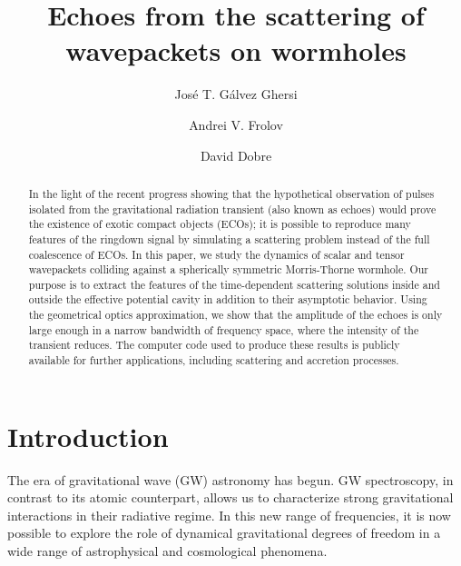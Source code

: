 \documentclass[article,aps,nofootinbib,twocolumn,superscriptaddress]{revtex4-1}
\begin{document}
\title{Echoes from the scattering of wavepackets on wormholes}

\author{Jos\'e T. G\'alvez Ghersi}
\author{Andrei V. Frolov}
\author{David Dobre}


\begin{abstract}
In the light of the recent progress showing that the hypothetical observation of pulses isolated from the gravitational radiation transient (also known as echoes) would prove the existence of exotic compact objects (ECOs); it is possible to reproduce many features of the ringdown signal by simulating a scattering problem instead of the full coalescence of ECOs. In this paper, we study the dynamics of scalar and tensor wavepackets colliding against a spherically symmetric Morris-Thorne wormhole. Our purpose is to extract the features of the time-dependent scattering solutions inside and outside the effective potential cavity in addition to their asymptotic behavior. Using the geometrical optics approximation, we show that the amplitude of the echoes is only large enough in a narrow bandwidth of frequency space, where the intensity of the transient reduces. The computer code used to produce these results is publicly available for further applications, including scattering and accretion processes.      
\end{abstract}

\maketitle


\section{Introduction}
The era of gravitational wave (GW) astronomy \citep{Abbott:2016blz, Abbott:2016nmj} has begun. GW spectroscopy, in contrast to its atomic counterpart, allows us to characterize strong gravitational interactions in their radiative regime. In this new range of frequencies, it is now possible to explore the role of dynamical gravitational degrees of freedom in a wide range of astrophysical \citep{Frolov:2017asg, Cardoso:2016rao} and cosmological \citep{Krauss989, Ade:2018gkx} phenomena. 
\end{document}

